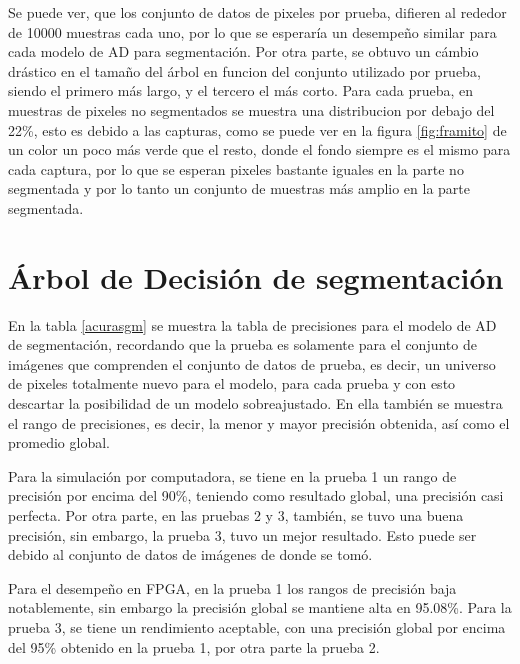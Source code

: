\documentclass[twoside,spanish,ESP,MSc]{plantillaLabUPV}
\theoremstyle{definition}
\begin{document}
Se puede ver, que los conjunto de datos de pixeles por prueba, difieren al rededor de 10000 muestras cada uno, por lo que se esperaría un desempeño similar para cada modelo de AD para segmentación. Por otra parte, se obtuvo un cámbio drástico en el tamaño del árbol en funcion del conjunto utilizado por prueba, siendo el primero más largo, y el tercero el más corto. Para cada prueba, en muestras de pixeles no segmentados se muestra una distribucion por debajo del 22\%, esto es debido a las capturas, como se puede ver en la figura \ref{fig:framito} de un color un poco más verde que el resto, donde el fondo siempre es el mismo para cada captura, por lo que se esperan pixeles bastante iguales en la parte no segmentada y por lo tanto un conjunto de muestras más amplio en la parte segmentada. 

\section{Árbol de Decisión de segmentación}

En la tabla \ref{acurasgm} se muestra la tabla de precisiones para el modelo de AD de segmentación, recordando que la prueba es solamente para el conjunto de imágenes que comprenden el conjunto de datos de prueba, es decir, un universo de pixeles totalmente nuevo para el modelo, para cada prueba y con esto descartar la posibilidad de un modelo sobreajustado. En ella también se muestra el rango de precisiones, es decir, la menor y mayor precisión obtenida, así como el promedio global.  


Para la simulación por computadora, se tiene en la prueba 1 un rango de precisión por encima del 90\%, teniendo como resultado global, una precisión casi perfecta. Por otra parte, en las pruebas 2 y 3, también, se tuvo una buena precisión, sin embargo, la prueba 3, tuvo un mejor resultado. Esto puede ser debido al conjunto de datos de imágenes de donde se tomó.  

Para el desempeño en FPGA, en la prueba 1 los rangos de precisión baja notablemente, sin embargo la precisión global se mantiene alta en 95.08\%. Para la prueba 3, se tiene un rendimiento aceptable, con una precisión global por encima del 95\% obtenido en la prueba 1, por otra parte la prueba 2.
\end{document}
